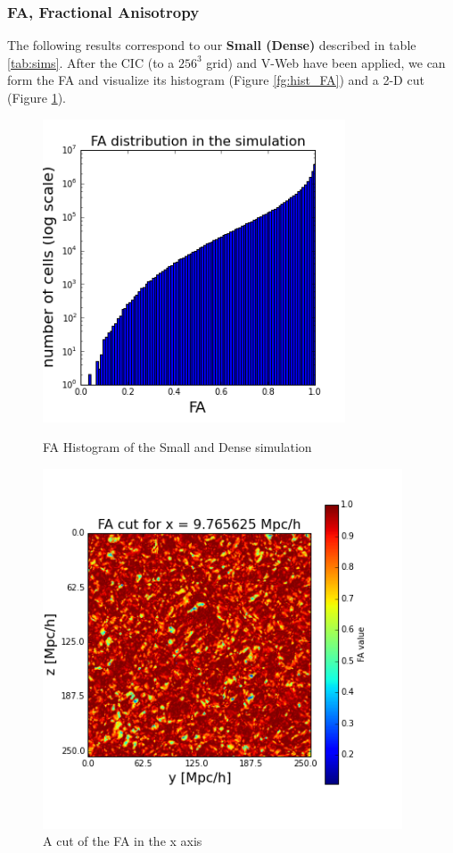 \documentclass[12pt]{article}
\begin{document}
\subsubsection{FA, Fractional Anisotropy}
The following results correspond to our
 \textbf{Small (Dense)} described in table
  \ref{tab:sims}. After the CIC (to a $256^{3}$
   grid) and V-Web have been applied, we can form
    the FA and visualize its histogram (Figure
     \ref{fg:hist_FA}) and a 2-D cut (Figure
      \ref{fg:cut_FA}).
\begin{figure}[ht]
\centering
\begin{minipage}{.5\textwidth}
  \centering
  \includegraphics[width=0.8\textwidth]{simulation/FA_hist_sim.png}
  \caption{FA Histogram of the Small and Dense simulation}
\label{fg:hist_FA}
\end{minipage}%
\begin{minipage}{.5\textwidth}
  \centering
  \includegraphics[width=0.95\textwidth]{simulation/FA_cut_i_10.png}
  \caption{A cut of the FA in the x axis}
\label{fg:cut_FA}
\end{minipage}
\end{figure}
\FloatBarrier
\end{document}
